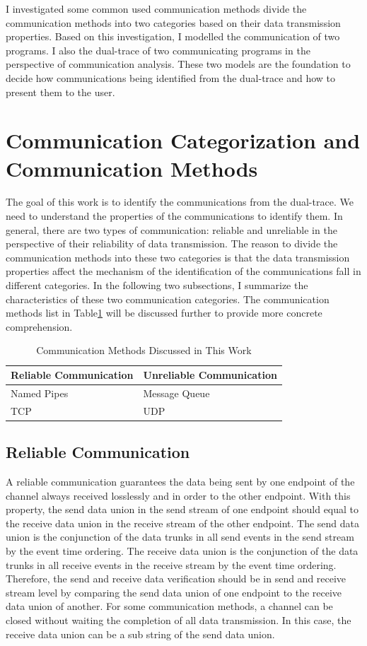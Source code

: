 
\label{chapter:Mod}
I investigated some common used communication methods divide the communication methods into two categories based on their data transmission properties. Based on this investigation, I modelled the communication of two programs. I also the dual-trace of two communicating programs in the perspective of communication analysis. These two models are the foundation to decide how communications being identified from the dual-trace and how to present them to the user.

\section{Communication Categorization and Communication Methods}
The goal of this work is to identify the communications from the dual-trace. We need to understand the properties of the communications to identify them. In general, there are two types of communication: reliable and unreliable in the perspective of their reliability of data transmission. The reason to divide the communication methods into these two categories is that the data transmission properties affect the mechanism of the identification of the communications fall in different categories. In the following two subsections, I summarize the characteristics of these two communication categories. The communication methods list in Table\ref{methodsInCategories} will be discussed further to provide more concrete comprehension. 
\begin{table}[H]
\centering
\caption{Communication Methods Discussed in This Work}
\label{methodsInCategories}
\begin{tabular}{|l|l|}
 \hline
\textbf{Reliable Communication}& \textbf{Unreliable Communication}\\
 \hline
Named Pipes & Message Queue   \\
TCP &  UDP \\
 \hline
\end{tabular}
\end{table}


\subsection{Reliable Communication}\label{reliable}
A reliable communication guarantees the data being sent by one endpoint of the channel always received losslessly and in order to the other endpoint. With this property, the send data union in the send stream of one endpoint should equal to the receive data union in the receive stream of the other endpoint. The send data union is the conjunction of the data trunks in all send events in the send stream by the event time ordering. The receive data union is the conjunction of the data trunks in all receive events in the receive stream by the event time ordering. Therefore, the send and receive data verification should be in send and receive stream level by comparing the send data union of one endpoint to the receive data union of another. For some communication methods, a channel can be closed without waiting the completion of all data transmission. In this case, the receive data union can be a sub string of the send data union.

